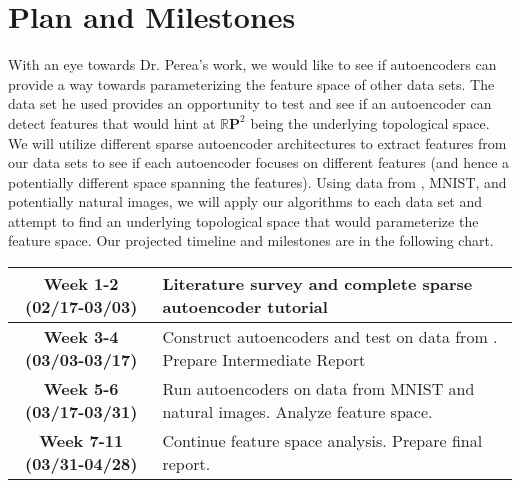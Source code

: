 \documentclass[sigconf]{acmart}
\newcommand\mb[1]{\mathbb{#1}}
\begin{document}
\section{Plan and Milestones\\}

	With an eye towards Dr. Perea's work, we would like to see if autoencoders can provide a way towards parameterizing the feature space of other data sets. The data set he used provides an opportunity to test and see if an autoencoder can detect features that would hint at $\mb{R}\textbf{P}^2$ being the underlying topological space. We will utilize different sparse autoencoder architectures to extract features from our data sets to see if each autoencoder focuses on different features (and hence a potentially different space spanning the features). Using data from \cite{perea}, MNIST, and potentially natural images, we will apply our algorithms to each data set and attempt to find an underlying topological space that would parameterize the feature space. Our projected timeline and milestones are in the following chart.\\

\begin{tabular}{|c|L{4cm}|}
	\hline
	\textbf{Week 1-2 (02/17-03/03)} & Literature survey and complete sparse autoencoder tutorial \cite{ufldl} \\
	\hline
	\textbf{Week 3-4 (03/03-03/17)} & Construct autoencoders and test on data from \cite{perea}. Prepare Intermediate Report\\
	\hline
	\textbf{Week 5-6 (03/17-03/31)} & Run autoencoders on data from MNIST and natural images. Analyze feature space.\\
	\hline
	\textbf{Week 7-11 (03/31-04/28)} & Continue feature space analysis. Prepare final report.\\
	\hline
\end{tabular}

	
	
	



	
	
	
\end{document}
